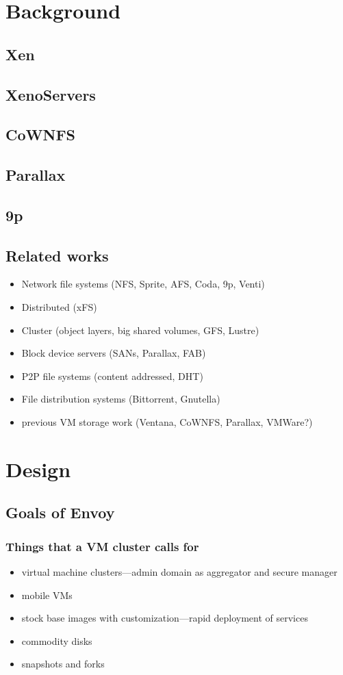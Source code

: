 \documentclass[a4paper,12pt]{article}
\begin{document}
\section{Background}

\subsection{Xen}
\subsection{XenoServers}
\subsection{CoWNFS}
\subsection{Parallax}
\subsection{9p}
\subsection{Related works}
\begin{itemize}
\item Network file systems (NFS, Sprite, AFS, Coda, 9p, Venti)
\item Distributed (xFS)
\item Cluster (object layers, big shared volumes, GFS, Lustre)
\item Block device servers (SANs, Parallax, FAB)
\item P2P file systems (content addressed, DHT)
\item File distribution systems (Bittorrent, Gnutella)
\item previous VM storage work (Ventana, CoWNFS, Parallax, VMWare?)
\end{itemize}


\section{Design}
\subsection{Goals of Envoy}
\subsubsection{Things that a VM cluster calls for}
\begin{itemize}
\item virtual machine clusters---admin domain as aggregator and secure manager
\item mobile VMs
\item stock base images with customization---rapid deployment of services
\item commodity disks
\item snapshots and forks
\end{itemize}
\end{document}
